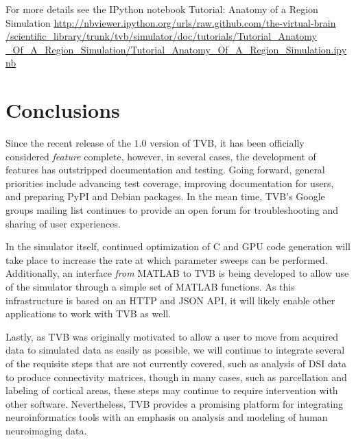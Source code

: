 \documentclass{bioinfo}
\begin{document}
For more details see the IPython notebook Tutorial: Anatomy of a Region Simulation 
\url{http://nbviewer.ipython.org/urls/raw.github.com/the-virtual-brain
/scientific_library/trunk/tvb/simulator/doc/tutorials/Tutorial_Anatomy
_Of_A_Region_Simulation/Tutorial_Anatomy_Of_A_Region_Simulation.ipynb}

\section{Conclusions}


Since the recent release of the $1.0$ version of TVB, it has been 
officially considered \textit{feature} complete, however, in several
cases, the development of features has outstripped documentation 
and testing. Going forward, general priorities include
advancing test coverage, improving documentation for users, and
preparing PyPI and Debian packages. In the mean
time, TVB's Google groups mailing list continues to
provide an open forum for troubleshooting and sharing of user experiences.

In the simulator itself, continued optimization of C and GPU code generation
will take place to increase the rate at which parameter sweeps can be
performed. Additionally, an interface \textit{from} MATLAB to TVB 
is being developed to allow use of the simulator through a simple
set of MATLAB functions. As this infrastructure is based on an HTTP and 
JSON API, it will likely enable other applications to work with TVB as well.

Lastly, as TVB was originally motivated to allow a user to move from
acquired data to simulated data as easily as possible, we will continue
to integrate several of the requisite steps that are not currently 
covered, such as analysis of DSI data to produce connectivity matrices,
though in many cases, such as parcellation and labeling of 
cortical areas, these steps may continue to require 
intervention with other software. Nevertheless, TVB provides a promising 
platform for integrating 
neuroinformatics tools with an emphasis on analysis and modeling of 
human neuroimaging data.

\end{document}
